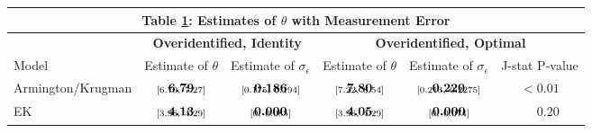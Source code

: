 \documentclass[12pt,dvips, ps2pdf]{article}
\renewcommand{\arraystretch}{1.1}
\begin{document}
\begin{table}[!t]
\footnotesize
{}
\renewcommand{\arraystretch}{1.65}
\setlength {\tabcolsep}{1.75mm}
\begin{center}
\label{tb:me_rslts}
\begin{tabular}[t]{l c c c c c}
\multicolumn{6}{c}{\normalsize \textbf{Table \ref{tb:me_rslts}: Estimates of $\theta$ with Measurement Error}}
\\
\hline
\hline
& \multicolumn{2}{c}{\textbf{Overidentified, Identity}} & \multicolumn{3}{c}{\textbf{Overidentified, Optimal}} \\
\cmidrule(l){2-3} \cmidrule(lr){4-6}
Model &  Estimate of $\theta$ & Estimate of $\sigma_{\epsilon}$ & Estimate of $\theta$ & Estimate of $\sigma_{\epsilon}$ & J-stat P-value \\
\hline
Armington/Krugman                   & $\begin{array}{c}{\textbf{6.79}} \vspace{-.4cm}\\ \scriptstyle{[6.70,   \ 7.27]}\end{array}$ & $\begin{array}{c}{\textbf{0.186}} \vspace{-.4cm}\\ \scriptstyle{[0.175,   \ 0.194]}\end{array}$ & $\begin{array}{c}{\textbf{7.80}} \vspace{-.4cm}\\ \scriptstyle{[7.22,   \ 8.54]}\end{array}$ & $\begin{array}{c}{\textbf{0.220}} \vspace{-.4cm}\\ \scriptstyle{[0.213,   \ 0.2275]}\end{array}$ & $< 0.01$\\
EK                       & $\begin{array}{c}{\textbf{4.13}} \vspace{-.4cm}\\ \scriptstyle{[3.96,   \ 4.29]}\end{array}$ & $\begin{array}{c}{\textbf{0.000}} \vspace{-.4cm}\\ \scriptstyle{[0,   \ 0.085]}\end{array}$    & $\begin{array}{c}{\textbf{4.05}} \vspace{-.4cm}\\ \scriptstyle{[3.96,   \ 4.29]}\end{array}$ & $\begin{array}{c}{\textbf{0.000}} \vspace{-.4cm}\\ \scriptstyle{[0,   \ 0.074]}\end{array}$ & $\phantom{<} 0.20$    \\

\end{tabular}
\end{center}
\end{table}
\end{document}
